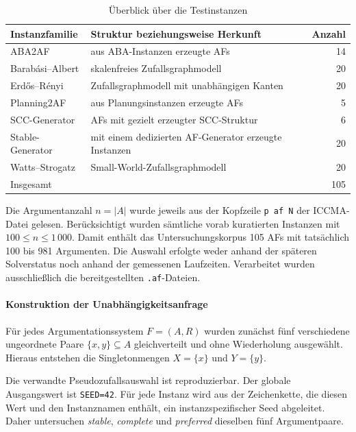 \begin{table}[htbp]
    \centering
    \begin{tabularx}{\textwidth}{@{}lXr@{}}
        \toprule
        Instanzfamilie & Struktur beziehungsweise Herkunft & Anzahl \\
        \midrule
        ABA2AF & aus ABA-Instanzen erzeugte AFs & 14 \\
        Barabási--Albert & skalenfreies Zufallsgraphmodell & 20 \\
        Erdős--Rényi & Zufallsgraphmodell mit unabhängigen Kanten & 20 \\
        Planning2AF & aus Planungsinstanzen erzeugte AFs & 5 \\
        SCC-Generator & AFs mit gezielt erzeugter SCC-Struktur & 6 \\
        Stable-Generator & mit einem dedizierten AF-Generator erzeugte Instanzen & 20 \\
        Watts--Strogatz & Small-World-Zufallsgraphmodell & 20 \\
        \midrule
        Insgesamt & & 105 \\
        \bottomrule
    \end{tabularx}
    \caption{Überblick über die Testinstanzen}
    \label{tab:experimental-instance-corpus}
\end{table}

Die Argumentanzahl \(n=|A|\) wurde jeweils aus der Kopfzeile
\texttt{p af N} der ICCMA-Datei gelesen. Berücksichtigt wurden sämtliche
vorab kuratierten Instanzen mit
\(
  100\leq n\leq 1\,000.
\)
Damit enthält das Untersuchungskorpus 105 AFs mit tatsächlich 100 bis
981 Argumenten. Die
Auswahl erfolgte weder anhand der späteren Solverstatus noch anhand der
gemessenen Laufzeiten. Verarbeitet wurden ausschließlich die bereitgestellten
\texttt{.af}-Dateien.

\paragraph{Konstruktion der Unabhängigkeitsanfrage}
\label{subsec:query-construction}

Für jedes Argumentationssystem \(F=(A,R)\) wurden zunächst fünf
verschiedene ungeordnete Paare \(\{x,y\}\subseteq A\) gleichverteilt und
ohne Wiederholung ausgewählt. Hieraus entstehen die Singletonmengen
\(X=\{x\}\) und \(Y=\{y\}\).

Die verwandte Pseudozufallsauswahl ist reproduzierbar. Der globale Ausgangswert ist
\texttt{SEED=42}. Für jede Instanz wird aus der Zeichenkette, die diesen
Wert und den Instanznamen enthält, ein instanzspezifischer
Seed abgeleitet. Daher untersuchen \emph{stable}, \emph{complete} und \emph{preferred}
dieselben fünf Argumentpaare.

